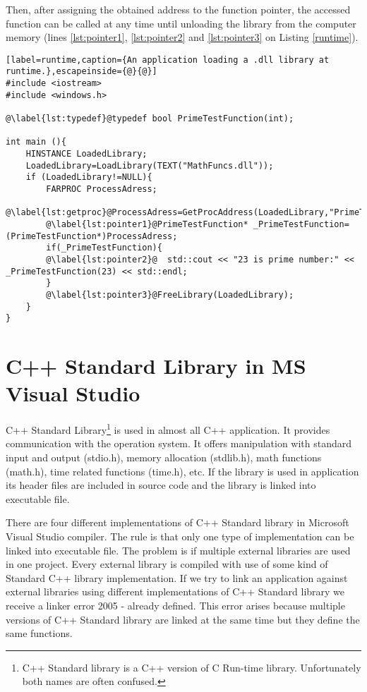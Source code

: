 Then, after assigning the obtained address to the function pointer, the accessed function can be called at any time until unloading the library from the computer memory (lines \ref{lst:pointer1}, \ref{lst:pointer2} and \ref{lst:pointer3} on Listing \ref{runtime}).

\begin{lstlisting}[label=runtime,caption={An application loading a .dll library at runtime.},escapeinside={@}{@}]
#include <iostream>
#include <windows.h>

@\label{lst:typedef}@typedef bool PrimeTestFunction(int);

int main (){
	HINSTANCE LoadedLibrary;
	LoadedLibrary=LoadLibrary(TEXT("MathFuncs.dll"));
	if (LoadedLibrary!=NULL){
		FARPROC ProcessAdress;
		@\label{lst:getproc}@ProcessAdress=GetProcAddress(LoadedLibrary,"PrimeTest");
		@\label{lst:pointer1}@PrimeTestFunction* _PrimeTestFunction=(PrimeTestFunction*)ProcessAdress;
		if(_PrimeTestFunction){
		@\label{lst:pointer2}@	std::cout << "23 is prime number:" << _PrimeTestFunction(23) << std::endl;
		}
		@\label{lst:pointer3}@FreeLibrary(LoadedLibrary);
	}
}
\end{lstlisting}



\section{C++ Standard Library in MS Visual Studio}

\label{standardlibrary}
C++ Standard Library\footnote{C++ Standard library is a C++ version of C Run-time library. Unfortunately both names are often confused.} is used in almost all C++ application. It provides communication with the operation system. It offers manipulation with standard input and output (stdio.h), memory allocation (stdlib.h), math functions (math.h), time related functions (time.h), etc. If the library is used in application its header files are included in source code and the library is linked into executable file.

There are four different implementations of C++ Standard library in Microsoft Visual Studio compiler. The rule is that only one type of implementation can be linked into executable file. The problem is if multiple external libraries are used in one project. Every external library is compiled with use of some kind of Standard C++ library implementation. If we try to link an application against external libraries using different implementations of C++ Standard library we receive a linker error 2005 - already defined. This error arises because multiple versions of C++ Standard library are linked at the same time but they define the same functions.

